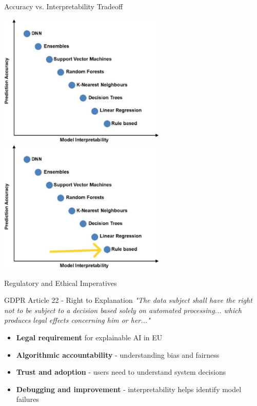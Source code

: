 \documentclass[aspectratio=169]{beamer}
\begin{document}
\begin{frame}{Accuracy vs. Interpretability Tradeoff}
    \begin{overprint}
        \includegraphics[width=0.6\textwidth]{../../fig/interp_over_power.jpg}
        \includegraphics[width=0.6\textwidth]{../../fig/interp_over_power_accent.jpg}
    \end{overprint}
    
\end{frame}

\begin{frame}{Regulatory and Ethical Imperatives}
    \begin{block}{GDPR Article 22 - Right to Explanation}
        \textit{"The data subject shall have the right not to be subject to a decision based solely on automated processing... which produces legal effects concerning him or her..."}
    \end{block}
    \pause
    
    \begin{itemize}
        \item \textbf{Legal requirement} for explainable AI in EU
        \item \textbf{Algorithmic accountability} - understanding bias and fairness
        \item \textbf{Trust and adoption} - users need to understand system decisions
        \item \textbf{Debugging and improvement} - interpretability helps identify model failures
    \end{itemize}
\end{frame}
\end{document}
